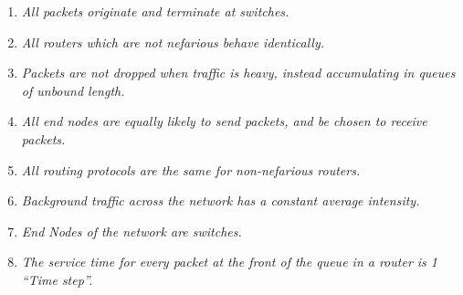 \begin{enumerate}
\item \emph{All packets originate and terminate at switches.}
\item \emph{All routers which are not nefarious behave identically.}
\item \emph{Packets are not dropped when traffic is heavy, instead accumulating in queues of unbound length.}
\item \emph{All end nodes are equally likely to send packets, and be chosen to receive packets.}
\item \emph{All routing protocols are the same for non-nefarious routers.}
\item \emph{Background traffic across the network has a constant average intensity.}
\item \emph{End Nodes of the network are switches.}
\item \emph{The service time for every packet at the front of the queue in a router is 1 “Time step”.}
\end{enumerate}


